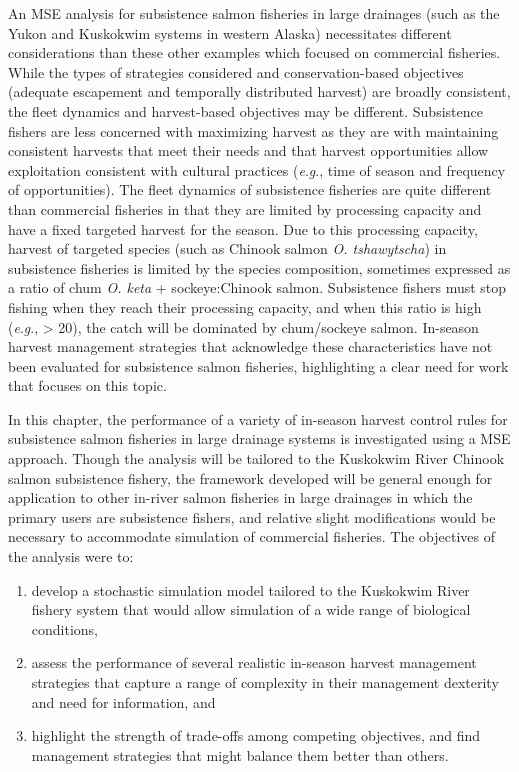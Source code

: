 \documentclass[12pt,]{book}
\theoremstyle{definition}
\theoremstyle{definition}
\theoremstyle{definition}
\theoremstyle{remark}
\begin{document}
An MSE analysis for subsistence salmon fisheries in large drainages
(such as the Yukon and Kuskokwim systems in western Alaska) necessitates
different considerations than these other examples which focused on
commercial fisheries. While the types of strategies considered and
conservation-based objectives (adequate escapement and temporally
distributed harvest) are broadly consistent, the fleet dynamics and
harvest-based objectives may be different. Subsistence fishers are less
concerned with maximizing harvest as they are with maintaining
consistent harvests that meet their needs and that harvest opportunities
allow exploitation consistent with cultural practices
(\emph{e}.\emph{g}., time of season and frequency of opportunities). The
fleet dynamics of subsistence fisheries are quite different than
commercial fisheries in that they are limited by processing capacity and
have a fixed targeted harvest for the season. Due to this processing
capacity, harvest of targeted species (such as Chinook salmon \emph{O.
tshawytscha}) in subsistence fisheries is limited by the species
composition, sometimes expressed as a ratio of chum \emph{O. keta} +
sockeye:Chinook salmon. Subsistence fishers must stop fishing when they
reach their processing capacity, and when this ratio is high
(\emph{e}.\emph{g}., \textgreater{} 20), the catch will be dominated by
chum/sockeye salmon. In-season harvest management strategies that
acknowledge these characteristics have not been evaluated for
subsistence salmon fisheries, highlighting a clear need for work that
focuses on this topic.

In this chapter, the performance of a variety of in-season harvest
control rules for subsistence salmon fisheries in large drainage systems
is investigated using a MSE approach. Though the analysis will be
tailored to the Kuskokwim River Chinook salmon subsistence fishery, the
framework developed will be general enough for application to other
in-river salmon fisheries in large drainages in which the primary users
are subsistence fishers, and relative slight modifications would be
necessary to accommodate simulation of commercial fisheries. The
objectives of the analysis were to:

\begin{enumerate}
\def\labelenumi{(\arabic{enumi})}
\item
  develop a stochastic simulation model tailored to the Kuskokwim River
  fishery system that would allow simulation of a wide range of
  biological conditions,
\item
  assess the performance of several realistic in-season harvest
  management strategies that capture a range of complexity in their
  management dexterity and need for information, and
\item
  highlight the strength of trade-offs among competing objectives, and
  find management strategies that might balance them better than others.
\end{enumerate}
\end{document}
